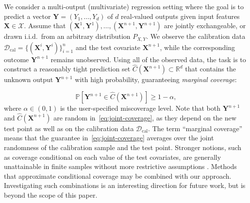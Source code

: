 {\color{blue} We consider a multi-output (multivariate) regression setting where the
goal is to predict a vector
$\mathbf{Y}=(Y_1,\ldots,Y_d)$ of $d$ real-valued outputs given input
features $\mathbf{X}\in\mathcal{X}$.
Assume that
$(\mathbf{X}^1,\mathbf{Y}^1),\ldots,(\mathbf{X}^{n+1},\mathbf{Y}^{n+1})$ are jointly exchangeable, or drawn
i.i.d.\ from an arbitrary distribution $P_{X,Y}$. We observe the
calibration data $\mathcal D_{\mathrm{cal}}=\{(\mathbf{X}^i,\mathbf{Y}^i)\}_{i=1}^n$
and the test covariate $\mathbf{X}^{n+1}$, while the corresponding outcome
$\mathbf{Y}^{n+1}$ remains unobserved.
Using all of the observed data, the task is to construct a reasonably tight prediction set $\hat{C}(\mathbf{X}^{n+1}) \subset \mathbb{R}^d$ that contains the unknown output $\mathbf{Y}^{n+1}$ with high probability, guaranteeing \emph{marginal coverage}:

\begin{equation}
\mathbb{P}\!\left[ \mathbf{Y}^{n+1} \in \hat{C}(\mathbf{X}^{n+1}) \right] \ge 1 - \alpha,
\label{eq:joint-coverage}
\end{equation}
where $\alpha \in (0,1)$ is the user-specified miscoverage level.  
Note that both $\mathbf{Y}^{n+1}$ and $\hat{C}(\mathbf{X}^{n+1})$ are random in~\eqref{eq:joint-coverage}, as they depend on the new test point as well as on the calibration data $\mathcal{D}_{\mathrm{cal}}$.  
The term ``marginal coverage'' means that the guarantee in~\eqref{eq:joint-coverage} averages over the joint randomness of the calibration sample and the test point. Stronger notions, such as coverage conditional on each value of the test covariates, are generally unattainable in finite samples without more restrictive assumptions \citep{foygel2021limits}. Methods that approximate conditional coverage \citep{Romano2020With,gibbs2025conformal} may be combined with our approach. Investigating such combinations is an interesting direction for future work, but is beyond the scope of this paper.}


